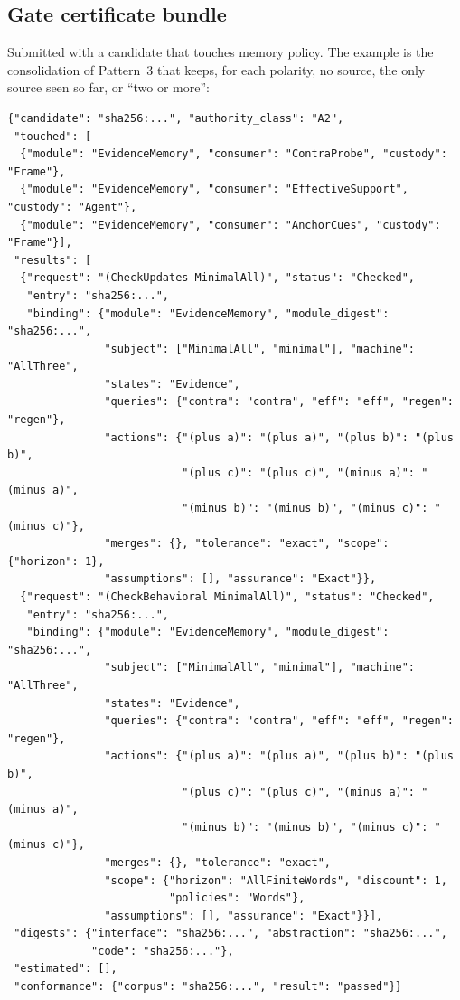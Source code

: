 \documentclass[11pt]{article}
\theoremstyle{definition}
\theoremstyle{plain}
\begin{document}
\subsection{Gate certificate bundle}

Submitted with a candidate that touches memory policy. The example is the consolidation of
Pattern~3 that keeps, for each polarity, no source, the only source seen so far, or ``two or
more'':
\begin{lstlisting}
{"candidate": "sha256:...", "authority_class": "A2",
 "touched": [
  {"module": "EvidenceMemory", "consumer": "ContraProbe", "custody": "Frame"},
  {"module": "EvidenceMemory", "consumer": "EffectiveSupport", "custody": "Agent"},
  {"module": "EvidenceMemory", "consumer": "AnchorCues", "custody": "Frame"}],
 "results": [
  {"request": "(CheckUpdates MinimalAll)", "status": "Checked",
   "entry": "sha256:...",
   "binding": {"module": "EvidenceMemory", "module_digest": "sha256:...",
               "subject": ["MinimalAll", "minimal"], "machine": "AllThree",
               "states": "Evidence",
               "queries": {"contra": "contra", "eff": "eff", "regen": "regen"},
               "actions": {"(plus a)": "(plus a)", "(plus b)": "(plus b)",
                           "(plus c)": "(plus c)", "(minus a)": "(minus a)",
                           "(minus b)": "(minus b)", "(minus c)": "(minus c)"},
               "merges": {}, "tolerance": "exact", "scope": {"horizon": 1},
               "assumptions": [], "assurance": "Exact"}},
  {"request": "(CheckBehavioral MinimalAll)", "status": "Checked",
   "entry": "sha256:...",
   "binding": {"module": "EvidenceMemory", "module_digest": "sha256:...",
               "subject": ["MinimalAll", "minimal"], "machine": "AllThree",
               "states": "Evidence",
               "queries": {"contra": "contra", "eff": "eff", "regen": "regen"},
               "actions": {"(plus a)": "(plus a)", "(plus b)": "(plus b)",
                           "(plus c)": "(plus c)", "(minus a)": "(minus a)",
                           "(minus b)": "(minus b)", "(minus c)": "(minus c)"},
               "merges": {}, "tolerance": "exact",
               "scope": {"horizon": "AllFiniteWords", "discount": 1,
                         "policies": "Words"},
               "assumptions": [], "assurance": "Exact"}}],
 "digests": {"interface": "sha256:...", "abstraction": "sha256:...",
             "code": "sha256:..."},
 "estimated": [],
 "conformance": {"corpus": "sha256:...", "result": "passed"}}
\end{lstlisting}
\end{document}

